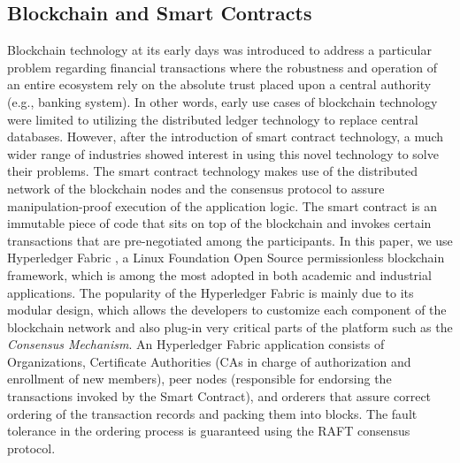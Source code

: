 




\subsection{Blockchain and Smart Contracts}
Blockchain technology at its early days was introduced to address a particular problem regarding financial transactions where the robustness and operation of an entire ecosystem rely on the absolute trust placed upon a central authority (e.g., banking system). In other words, early use cases of blockchain technology were limited to utilizing the distributed ledger technology to replace central databases. However, after the introduction of smart contract technology, a much wider range of industries showed interest in using this novel technology to solve their problems. The smart contract technology makes use of the distributed network of the blockchain nodes and the consensus protocol to assure manipulation-proof execution of the application logic. The smart contract is an immutable piece of code that sits on top of the blockchain and invokes certain transactions that are pre-negotiated among the participants. In this paper, we use Hyperledger Fabric \cite{fabric}, a Linux Foundation Open Source permissionless blockchain framework, which is among the most adopted in both academic and industrial applications. 
The popularity of the Hyperledger Fabric is mainly due to its modular design, which allows the developers to customize each component of the blockchain network and also plug-in very critical parts of the platform such as the \textit{Consensus Mechanism}. 
An Hyperledger Fabric application consists of Organizations, Certificate Authorities  (CAs in charge of authorization and enrollment of new members), peer nodes (responsible for endorsing the transactions invoked by the Smart Contract), and orderers that assure correct ordering of the transaction records and packing them into blocks. The fault tolerance in the ordering process is guaranteed using the RAFT \cite{Ongaro:raft} consensus protocol. 
